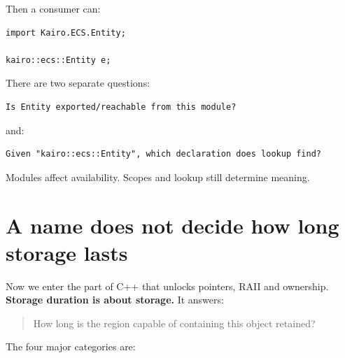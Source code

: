 Then a consumer can:

\begin{verbatim}
import Kairo.ECS.Entity;

kairo::ecs::Entity e;
\end{verbatim}

There are two separate questions:

\begin{verbatim}
Is Entity exported/reachable from this module?
\end{verbatim}

and:

\begin{verbatim}
Given "kairo::ecs::Entity", which declaration does lookup find?
\end{verbatim}

Modules affect availability. Scopes and lookup still determine meaning.

\section{A name does not decide how long storage lasts}\label{01-foundations-i-ch002-a-name-does-not-decide-how-long-storage-lasts}

\hypertarget{01-foundations-i-ch002-a-name-does-not-decide-how-long-storage-lasts}{}

Now we enter the part of C++ that unlocks pointers, RAII and ownership. \textbf{Storage duration is about storage.} It answers:

\begin{quote}
How long is the region capable of containing this object retained?
\end{quote}

The four major categories are:

